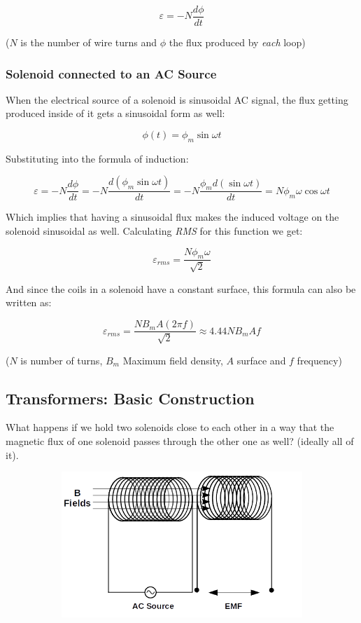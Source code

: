 \documentclass{article}
\begin{document}
	$$ \varepsilon = -N\frac{d\phi}{dt} $$
	
	($N$ is the number of wire turns and $\phi$ the flux produced by \textit{each} loop)
	
	\subsubsection{Solenoid connected to an AC Source}	
	When the electrical source of a solenoid is sinusoidal AC signal, the flux getting produced inside of it gets a sinusoidal form as well:
	
	$$ \phi(t) = \phi_{m} \sin \omega t $$
	
	Substituting into the formula of induction:
	
	$$ \varepsilon = -N \frac{d\phi}{dt} = - N \frac{d (\phi_{m} \sin \omega t)}{dt} = -N \frac{\phi_{m} d (\sin \omega t)}{dt} = N \phi_{m} \omega \cos \omega t $$
	
	Which implies that having a sinusoidal flux makes the induced voltage on the solenoid sinusoidal as well.
	Calculating \textit{RMS} for this function we get:
	
	$$ \varepsilon_{rms} = \frac{N \phi_{m} \omega}{\sqrt{2}}$$
	
	And since the coils in a solenoid have a constant surface, this formula can also be written as:
	
	$$ \varepsilon_{rms} = \frac{N B_{m} A (2\pi f)}{\sqrt{2}} \approx 4.44NB_{m}Af $$
	
	($N$ is number of turns, $B_m$ Maximum field density, $A$ surface and $f$ frequency)
		
	\subsection{Transformers: Basic Construction}
	
	What happens if we hold two solenoids close to each other in a way that the magnetic flux of one solenoid passes through the other one as well? (ideally all of it).
	
	\begin{figure}[h!]
	\centering
	\begin{subfigure}[b]{0.9\linewidth}
		\includegraphics[width=\linewidth]{basic_transformer.png}
	\end{subfigure}
	\end{figure}
	
\end{document}
